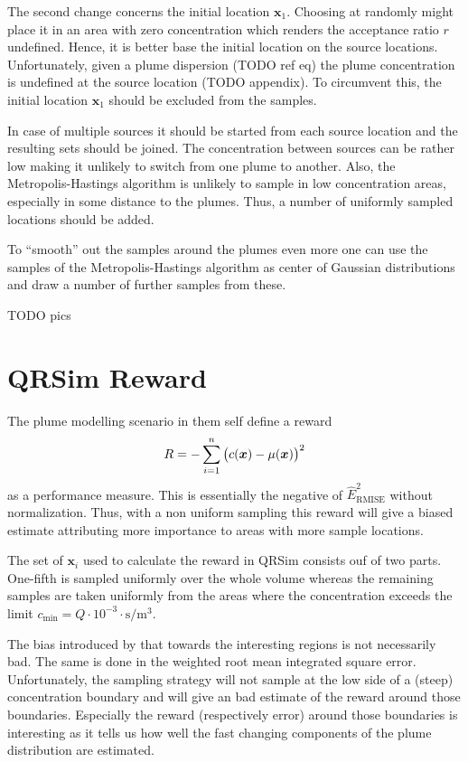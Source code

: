 \documentclass[11pt,a4paper]{scrreprt}
\newcommand{\vc}[1]{\bm{#1}}
\newcommand{\ped}[1]{_{\mathrm{#1}}}
\begin{document}
The second change concerns the initial location $\vc x_1$. Choosing at randomly 
might place it in an area with zero concentration which renders the acceptance 
ratio $r$ undefined. Hence, it is better base the initial location on the source 
locations. Unfortunately, given a plume dispersion (TODO ref eq) the plume 
concentration is undefined at the source location (TODO appendix). To circumvent 
this, the initial location $\vc x_1$ should be excluded from the samples.

In case of multiple sources it should be started from each source location and 
the resulting sets should be joined. The concentration between sources can be 
rather low making it unlikely to switch from one plume to another. Also, the 
Metropolis-Hastings algorithm is unlikely to sample in low concentration areas, 
especially in some distance to the plumes. Thus, a number of uniformly sampled 
locations should be added.

To ``smooth'' out the samples around the plumes even more one can use the 
samples of the Metropolis-Hastings algorithm as center of Gaussian distributions 
and draw a number of further samples from these.

TODO pics

\section{QRSim Reward}
The plume modelling scenario in \textcite{denardi2013rn} them self define 
a reward
\begin{equation}
    R = - \sum_{i = 1}^n \del{c(\vc x) - \mu(\vc x)}^2
\end{equation}
as a performance measure. This is essentially the negative of $\hat 
E\ped{RMISE}^2$ without normalization. Thus, with a non uniform sampling this 
reward will give a biased estimate attributing more importance to areas with 
more sample locations.

The set of $\vc x_i$ used to calculate the reward in QRSim consists ouf of two 
parts. One-fifth is sampled uniformly over the whole volume whereas the 
remaining samples are taken uniformly from the areas where the concentration 
exceeds the limit $c\ped{min} = Q \cdot 10^{-3} \cdot 
\si{\second\per\meter\cubed}$.

The bias introduced by that towards the interesting regions is not necessarily 
bad. The same is done in the weighted root mean integrated square error.  
Unfortunately, the sampling strategy will not sample at the low side of 
a (steep) concentration boundary and will give an bad estimate of the reward 
around those boundaries. Especially the reward (respectively error) around those 
boundaries is interesting as it tells us how well the fast changing components 
of the plume distribution are estimated.
\end{document}
